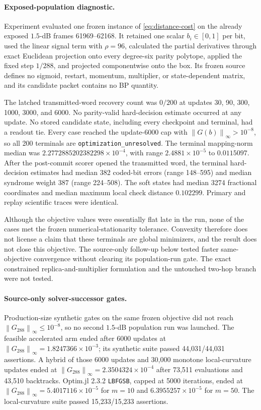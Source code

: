 \documentclass[11pt]{article}
\theoremstyle{remark}
\newcommand{\norm}[1]{\left\lVert#1\right\rVert}
\begin{document}
\paragraph{Exposed-population diagnostic.}
Experiment  evaluated one frozen
instance of \cref{eq:distance-cost} on the already exposed $1.5$-dB frames
61969--62168.  It retained one scalar $b_i\in[0,1]$ per bit, used the linear
signal term with $\rho=96$, calculated the partial derivatives through exact
Euclidean projection onto every degree-six parity polytope, applied the fixed
step $1/288$, and projected componentwise onto the box.  Its frozen source
defines no sigmoid, restart, momentum, multiplier, or state-dependent matrix,
and its candidate packet contains no BP quantity.

The latched transmitted-word recovery count was $0/200$ at updates 30, 90,
300, 1000, 3000, and 6000.  No parity-valid hard-decision estimate occurred at
any update.  No stored candidate state, including every checkpoint and
terminal, had a readout tie.  Every case reached the update-6000 cap with
$\norm{G(b)}_\infty>10^{-8}$, so all 200 terminals are
\texttt{optimization\_unresolved}.  The terminal mapping-norm median was
$2.2772885202382298\mathbin{\times}10^{-4}$, with range
$2.4881\mathbin{\times}10^{-5}$ to $0.0115097$.  After the post-commit scorer
opened the transmitted word, the terminal hard-decision estimates had median
382 coded-bit errors (range 148--595) and median syndrome weight 387 (range
224--508).  The soft states had median 3274 fractional coordinates and median
maximum local check distance $0.102299$.  Primary and replay scientific
traces were identical.

Although the objective values were essentially flat late in the run, none of
the cases met the frozen numerical-stationarity tolerance.  Convexity
therefore does not license a claim that these terminals are global minimizers,
and the result does not close this objective.  The source-only follow-up below
tested faster same-objective convergence without clearing its population-run
gate.  The exact constrained replica-and-multiplier formulation and the
untouched two-hop branch were not tested.

\paragraph{Source-only solver-successor gates.}
Production-size synthetic gates on the same frozen objective did not reach
$\norm{G_{288}}_\infty\leq 10^{-8}$, so no second $1.5$-dB population run was
launched.  The feasible accelerated arm ended after 6000 updates at
$\norm{G_{288}}_\infty=1.8247366\mathbin{\times}10^{-3}$; its synthetic suite
passed 44,031/44,031 assertions.  A hybrid of those 6000 updates and 30,000
monotone local-curvature updates ended at
$\norm{G_{288}}_\infty=2.3504324\mathbin{\times}10^{-4}$ after 73,511
evaluations and 43,510 backtracks.  Optim.jl 2.3.2 \texttt{LBFGSB}, capped at
5000 iterations, ended at
$\norm{G_{288}}_\infty=5.4017116\mathbin{\times}10^{-5}$ for $m=10$ and
$6.3955257\mathbin{\times}10^{-5}$ for $m=50$.  The local-curvature suite
passed 15,233/15,233 assertions.
\end{document}
